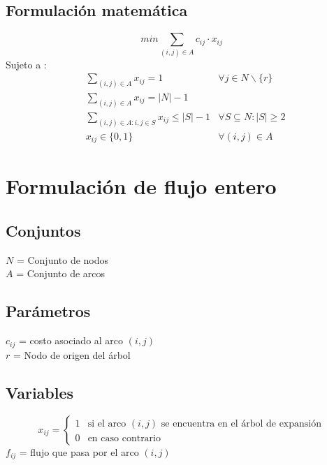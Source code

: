 \documentclass{article}
\numberwithin{equation}{section}
\begin{document}
\subsection{Formulación matemática}
\begin{equation}
min \sum_{(i,j) \in A} c_{ij} \cdot x_{ij}
\end{equation}
Sujeto a : \begin{align}
& \sum_{(i,j) \in A} x_{ij} = 1 &\forall j \in N \backslash \{r\}\\
& \sum_{(i,j) \in A} x_{ij} = |N| - 1\\
& \sum_{(i,j) \in A: i,j \in S} x_{ij} \leq |S| - 1 &\forall S \subseteq N : |S| \geq 2 \\
& x_{ij} \in \{0,1\} &\forall (i,j) \in A
\end{align}

\newpage
\section{Formulación de flujo entero}
\subsection{Conjuntos}
$N$ = Conjunto de nodos\\
$A$ = Conjunto de arcos
\subsection{Parámetros}
$c_{ij}$ = costo asociado al arco $(i,j)$\\
$r$ = Nodo de origen del árbol
\subsection{Variables}
\begin{center}
\[x_{ij}={\begin{cases}1&{\mbox{si el arco $(i,j)$ se encuentra en el árbol de expansión}}\\0&{\mbox{en caso contrario}}\end{cases}}
\]
$f_{ij}$ = flujo que pasa por el arco $(i,j)$
\end{center}
\end{document}

